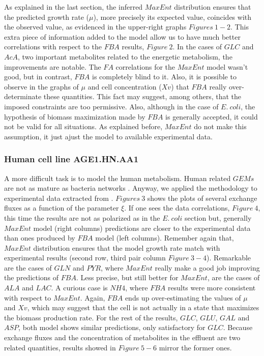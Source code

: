 \documentclass[]{article}
\begin{document}
	As explained in the last section, the inferred $MaxEnt$ distribution ensures that the predicted growth rate ($\mu$), more precisely its expected value, coincides with the observed value, as evidenced in the upper-right graphs $Figures\ 1-2$. 
	This extra piece of information added to the model allow us to have much better correlations with respect to the $FBA$ results, $Figure\ 2$.
	In the cases of $GLC$ and $AcA$, two important metabolites related to the energetic metabolism, the improvements are notable.
	The $FA$ correlations for the $MaxEnt$ model wasn't good, but in contrast, $FBA$ is completely blind to it.
	Also, it is possible to observe in the graphs of $\mu$ and cell concentration ($Xv$)  that $FBA$ really over-determinate these quantities. 
	This fact may suggest, among others, that the imposed constraints are too permissive. 
	Also, although in the case of $E.\ coli$, the hypothesis of biomass maximization made by $FBA$ is generally accepted, it could not be valid for all situations.
	As explained before, $MaxEnt$ do not make this assumption, it just ajust the model to available experimental data.


	\subsubsection{Human cell line AGE1.HN.AA1}

	A more difficult task is to model the human metabolism. 
	Human related $GEMs$ are not as mature as bacteria networks . 
	Anyway, we applied the methodology to experimental data extracted from . 
	$Figures\ 3$ shows the plots of several exchange fluxes as a function of the parameter $\xi$. 
	If one sees the data correlations, $Figure\ 4$, this time the results are not as polarized as in the $E.\ coli$ section but, generally $MaxEnt$ model (right columns) predictions are closer to the experimental data than ones produced by $FBA$ model (left columns). 
	Remember again that, $MaxEnt$ distribution ensures that the model growth rate match with experimental results (second row, third pair column $Figure\ 3 - 4$).
	Remarkable are the cases of $GLN$ and $PYR$, where $MaxEnt$ really make a good job improving the predictions of $FBA$. 
	Less precise, but still better for $MaxEnt$, are the cases of $ALA$ and $LAC$.  A curious case is $NH4$, where $FBA$ results were more consistent with respect to $MaxEnt$.
	Again, $FBA$ ends up over-estimating the values of $\mu$ and $Xv$, which may suggest that the cell is not actually in a state that maximizes the biomass production rate.
	For the rest of the results, $GLC$, $GLU$, $GAL$ and $ASP$, both model shows similar predictions, only satisfactory for $GLC$. 
	Because exchange fluxes and the concentration of metabolites in the effluent are two related quantities, results showed in $Figure\ 5 - 6$ mirror the former ones.
	
\end{document}
